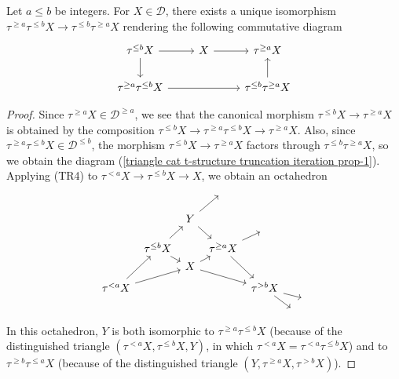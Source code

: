 \begin{proposition}\label{triangle cat t-structure truncation iteration prop}
Let $a\leq b$ be integers. For $X\in\mathcal{D}$, there exists a unique isomorphism $\tau^{\geq a}\tau^{\leq b}X\to\tau^{\leq b}\tau^{\geq a}X$ rendering the following commutative diagram
\begin{equation}\label{triangle cat t-structure truncation iteration prop-1}
\begin{tikzcd}
\tau^{\leq b}X\ar[d]\ar[r]&X\ar[r]&\tau^{\geq a}X\\
\tau^{\geq a}\tau^{\leq b}X\ar[rr]&&\tau^{\leq b}\tau^{\geq a}X\ar[u]
\end{tikzcd}
\end{equation}
\end{proposition}
\begin{proof}
Since $\tau^{\geq a}X\in\mathcal{D}^{\geq a}$, we see that the canonical morphism $\tau^{\leq b}X\to\tau^{\geq a}X$ is obtained by the composition $\tau^{\leq b}X\to\tau^{\geq a}\tau^{\leq b}X\to\tau^{\geq a}X$. Also, since $\tau^{\geq a}\tau^{\leq b}X\in\mathcal{D}^{\leq b}$, the morphism $\tau^{\leq b}X\to\tau^{\geq a}X$ factors through $\tau^{\leq b}\tau^{\geq a}X$, so we obtain the diagram (\ref{triangle cat t-structure truncation iteration prop-1}). Applying (TR4) to $\tau^{<a}X\to\tau^{\leq b}X\to X$, we obtain an octahedron
\vspace*{-2mm}
\begin{equation}\label{triangle cat t-structure truncation iteration prop-2}
\begin{tikzcd}[row sep=2pt,column sep=4pt]
&&&{}&\\
&&&{}&\\
&&Y\ar[ruu]\ar[rdd]&&\\
&&&{}&{}\\
&\tau^{\leq b}X\ar[rd]\ar[ruu]&&\tau^{\geq a}X\ar[ru]\ar[rddd]\\
&&X\ar[ru]\ar[rrdd]&&\\
&&&&\\
\tau^{<a}X\ar[ruuu]\ar[rruu]&&&&\tau^{>b}X\ar[rdd]\ar[rrd]\\
&&&&&&{}\\
&&&&&{}&
\end{tikzcd}
\vspace*{-2mm}
\end{equation}
In this octahedron, $Y$ is both isomorphic to $\tau^{\geq a}\tau^{\leq b}X$ (because of the distinguished triangle $(\tau^{<a}X,\tau^{\leq b}X,Y)$, in which $\tau^{<a}X=\tau^{<a}\tau^{\leq b}X$) and to $\tau^{\geq b}\tau^{\leq a}X$ (because of the distinguished triangle $(Y,\tau^{\geq a}X,\tau^{>b}X)$).
\end{proof}

